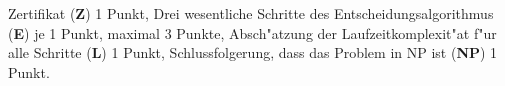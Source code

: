 \begin{bewertung}
Zertifikat ({\bf Z}) 1 Punkt,
Drei wesentliche Schritte des Entscheidungsalgorithmus ({\bf E}) je 1 Punkt,
maximal 3 Punkte,
Absch"atzung der Laufzeitkomplexit"at f"ur alle Schritte ({\bf L}) 1 Punkt,
Schlussfolgerung, dass das Problem in NP ist ({\bf NP}) 1 Punkt.
\end{bewertung}

